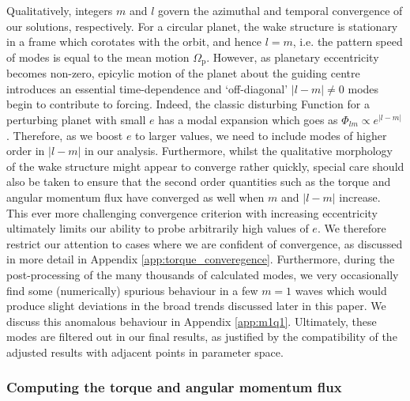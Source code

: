 Qualitatively, integers $m$ and $l$ govern the azimuthal and temporal convergence of our solutions, respectively. For a circular planet, the wake structure is stationary in a frame which corotates with the orbit, and hence $l=m$, i.e. the pattern speed of modes is equal to the mean motion $\Omega_\mathrm{p}$. However, as planetary eccentricity becomes non-zero, epicylic motion of the planet about the guiding centre introduces an essential time-dependence and `off-diagonal' $|l-m|\neq 0$ modes begin to contribute to forcing. Indeed, the classic disturbing Function for a perturbing planet with small $e$ has a modal expansion which goes as $\Phi_{lm}\propto e^{|l-m|}$ \citep[see][]{MurrayDermott_1999}. Therefore, as we boost $e$ to larger values, we need to include modes of higher order in $|l-m|$ in our analysis. Furthermore, whilst the qualitative morphology of the wake structure might appear to converge rather quickly, special care should also be taken to ensure that the second order quantities such as the torque and angular momentum flux have converged as well when $m$ and $|l-m|$ increase. This ever more challenging convergence criterion with increasing eccentricity ultimately limits our ability to probe arbitrarily high values of $e$. We therefore  restrict our attention to cases where we are confident of convergence, as discussed in more detail in Appendix \ref{app:torque_converegence}. Furthermore, during the post-processing of the many thousands of calculated modes, we very occasionally find some (numerically) spurious behaviour in a few $m=1$ waves which would produce slight deviations in the broad trends discussed later in this paper. We discuss this anomalous behaviour in Appendix \ref{app:m1q1}. Ultimately, these modes are filtered out in our final results, as justified by the compatibility of the adjusted results with adjacent points in parameter space.

\subsubsection{Computing the torque and angular momentum flux}
\label{subsubsection:torque_computation}


